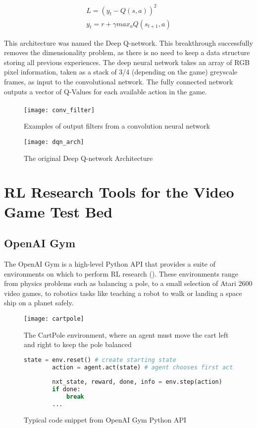 \begin{align}
    L = (y_t - Q(s, a))^2 \label{equ:DQLoss} \\
    y_t = r + \gamma max_{a}Q(s_{t+1}, a) \label{equ:DQTarget}
\end{align}

This architecture was named the Deep Q-network. This breakthrough successfully removes the dimensionality problem, as there is no need to keep a data structure storing all previous experiences. The deep neural network takes an array of RGB pixel information, taken as a stack of 3/4 (depending on the game) greyscale frames, as input to the convolutional network. The fully connected network outputs a vector of Q-Values for each available action in the game. \paragraph{}

\begin{figure}[H]
    \centering
    \texttt{[image: conv\_filter]}
    \caption{Examples of output filters from a convolution neural network}
\end{figure}
\begin{figure}[H]
    \centering
    \texttt{[image: dqn\_arch]}
    \caption{The original Deep Q-network Architecture}
\end{figure}

\section{RL Research Tools for the Video Game Test Bed}
\subsection{OpenAI Gym}
The OpenAI Gym is a high-level Python API that provides a suite of environments on which to perform RL research (\citet{openaigym}). These environments range from physics problems such as balancing a pole, to a small selection of Atari 2600 video games, to robotics tasks like teaching a robot to walk or landing a space ship on a planet safely.

\begin{figure}[H]
    \centering
    \texttt{[image: cartpole]}
    \caption{The CartPole environment, where an agent must move the cart left and right to keep the pole balanced}
\end{figure}

\begin{figure}[h]
    \centering
    \begin{lstlisting}[language=Python]
        state = env.reset() # create starting state
        action = agent.act(state) # agent chooses first action
        
        nxt_state, reward, done, info = env.step(action)
        if done:
            break
        ...
    \end{lstlisting}
    \caption{Typical code snippet from OpenAI Gym Python API}
\end{figure}

